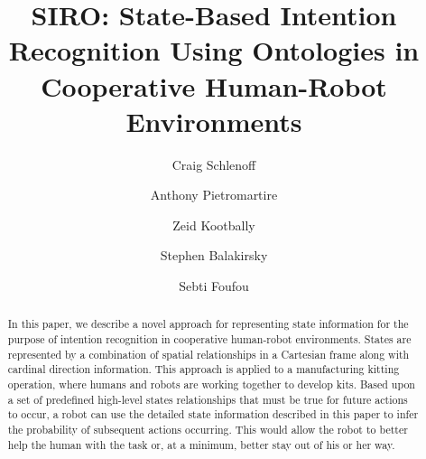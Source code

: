 \documentclass[preprint,12pt]{elsarticle}
\begin{document}
\begin{frontmatter}



\title{SIRO: State-Based Intention Recognition Using Ontologies in Cooperative Human-Robot Environments}

 \author[nist,le2i]{Craig Schlenoff}

 \author[nist]{Anthony Pietromartire}

 \author[umd]{Zeid Kootbally}

 \author[nist]{Stephen Balakirsky}

 \author[qatar,le2i]{Sebti Foufou}

 \address[nist]{National Institute of Standards and Technology (NIST), 100 Bureau Drive, Stop 8230, Gaithersburg MD 20899 USA}
 \address[le2i]{University of Burgundy, LE2i Lab, Dijon, France}
 \address[qatar]{Computer Science and Engineering Department Qatar University, Doha Qatar}
 \address[umd]{University of Maryland, Department of Mechanical Engineering, College Park MD 20742 USA}


\begin{abstract}
In this paper, we describe a novel approach for representing state information for the purpose of intention recognition in cooperative human-robot environments. States are represented by a combination of spatial relationships in a Cartesian frame along with cardinal direction information. This approach is applied to a manufacturing kitting operation, where humans and robots are working together to develop kits. Based upon a set of predefined high-level states relationships that must be true for future actions to occur, a robot can use the detailed state information described in this paper to infer the probability of subsequent actions occurring. This would allow the robot to better help the human with the task or, at a minimum, better stay out of his or her way.
\end{abstract}


\end{frontmatter}
\end{document}
